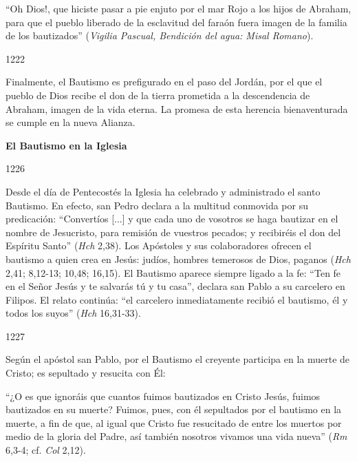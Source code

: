 			\begin{ccecite}“Oh Dios!, que hiciste pasar a pie enjuto por el mar Rojo a los hijos de Abraham, para que el pueblo liberado de la esclavitud del faraón fuera imagen de la familia de los bautizados” (\textit{Vigilia Pascual, Bendición del agua: Misal Romano}).\end{ccecite}
			
			\begin{ccebody}\begin{ccenumber}1222\end{ccenumber} Finalmente, el Bautismo es prefigurado en el paso del Jordán, por el que el pueblo de Dios recibe el don de la tierra prometida a la descendencia de Abraham, imagen de la vida eterna. La promesa de esta herencia bienaventurada se cumple en la nueva Alianza.\end{ccebody}
			
			\begin{ccebody}\textbf{El Bautismo en la Iglesia}\end{ccebody}
			
			\begin{ccebody}\begin{ccenumber}1226\end{ccenumber} Desde el día de Pentecostés la Iglesia ha celebrado y administrado el santo Bautismo. En efecto, san Pedro declara a la multitud conmovida por su predicación: “Convertíos [...] y que cada uno de vosotros se haga bautizar en el nombre de Jesucristo, para remisión de vuestros pecados; y recibiréis el don del Espíritu Santo” (\textit{Hch} 2,38). Los Apóstoles y sus colaboradores ofrecen el bautismo a quien crea en Jesús: judíos, hombres temerosos de Dios, paganos (\textit{Hch} 2,41; 8,12-13; 10,48; 16,15). El Bautismo aparece siempre ligado a la fe: “Ten fe en el Señor Jesús y te salvarás tú y tu casa”, declara san Pablo a su carcelero en Filipos. El relato continúa: “el carcelero inmediatamente recibió el bautismo, él y todos los suyos” (\textit{Hch} 16,31-33).\end{ccebody}
			
			\begin{ccebody}\begin{ccenumber}1227\end{ccenumber} Según el apóstol san Pablo, por el Bautismo el creyente participa en la muerte de Cristo; es sepultado y resucita con Él:\end{ccebody}
			
			\begin{ccecite}“¿O es que ignoráis que cuantos fuimos bautizados en Cristo Jesús, fuimos bautizados en su muerte? Fuimos, pues, con él sepultados por el bautismo en la muerte, a fin de que, al igual que Cristo fue resucitado de entre los muertos por medio de la gloria del Padre, así también nosotros vivamos una vida nueva” (\textit{Rm} 6,3-4; cf. \textit{Col} 2,12).\end{ccecite}
			
